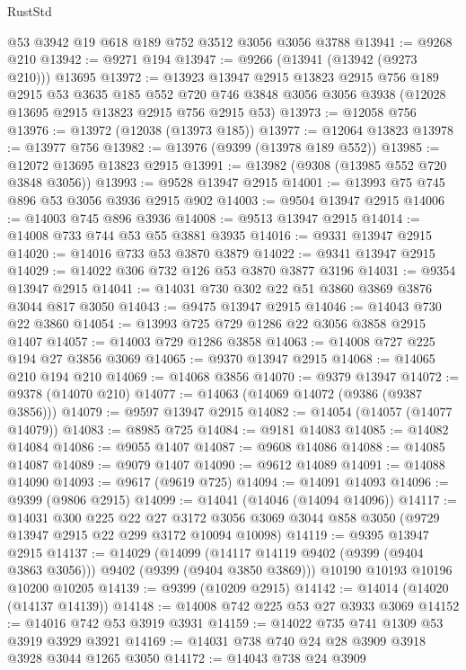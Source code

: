 \begin{lexlean}{RustStd}
\begin{coremodule}
    @53
    @3942
    @19
    @618
    @189
    @752
    @3512
    @3056
    @3056
    @3788
@13941 := @9268 @210
@13942 := @9271 @194
@13947 := @9266 (@13941 (@13942 (@9273 @210))) @13695
@13972 := @13923
    @13947
    @2915
    @13823
    @2915
    @756
    @189
    @2915
    @53
    @3635
    @185
    @552
    @720
    @746
    @3848
    @3056
    @3056
    @3938
    (@12028 @13695 @2915 @13823 @2915 @756 @2915 @53)
@13973 := @12058 @756
@13976 := @13972 (@12038 (@13973 @185))
@13977 := @12064 @13823
@13978 := @13977 @756
@13982 := @13976 (@9399 (@13978 @189 @552))
@13985 := @12072 @13695 @13823 @2915
@13991 := @13982 (@9308 (@13985 @552 @720 @3848 @3056))
@13993 := @9528 @13947 @2915
@14001 := @13993 @75 @745 @896 @53 @3056 @3936 @2915 @902
@14003 := @9504 @13947 @2915
@14006 := @14003 @745 @896 @3936
@14008 := @9513 @13947 @2915
@14014 := @14008 @733 @744 @53 @55 @3881 @3935
@14016 := @9331 @13947 @2915
@14020 := @14016 @733 @53 @3870 @3879
@14022 := @9341 @13947 @2915
@14029 := @14022 @306 @732 @126 @53 @3870 @3877 @3196
@14031 := @9354 @13947 @2915
@14041 := @14031 @730 @302 @22 @51 @3860 @3869 @3876 @3044 @817 @3050
@14043 := @9475 @13947 @2915
@14046 := @14043 @730 @22 @3860
@14054 := @13993 @725 @729 @1286 @22 @3056 @3858 @2915 @1407
@14057 := @14003 @729 @1286 @3858
@14063 := @14008 @727 @225 @194 @27 @3856 @3069
@14065 := @9370 @13947 @2915
@14068 := @14065 @210 @194 @210
@14069 := @14068 @3856
@14070 := @9379 @13947
@14072 := @9378 (@14070 @210)
@14077 := @14063 (@14069 @14072 (@9386 (@9387 @3856)))
@14079 := @9597 @13947 @2915
@14082 := @14054 (@14057 (@14077 @14079))
@14083 := @8985 @725
@14084 := @9181 @14083
@14085 := @14082 @14084
@14086 := @9055 @1407
@14087 := @9608 @14086
@14088 := @14085 @14087
@14089 := @9079 @1407
@14090 := @9612 @14089
@14091 := @14088 @14090
@14093 := @9617 (@9619 @725)
@14094 := @14091 @14093
@14096 := @9399 (@9806 @2915)
@14099 := @14041 (@14046 (@14094 @14096))
@14117 := @14031
    @300
    @225
    @22
    @27
    @3172
    @3056
    @3069
    @3044
    @858
    @3050
    (@9729 @13947 @2915 @22 @299 @3172 @10094 @10098)
@14119 := @9395 @13947 @2915
@14137 := @14029
    (@14099 (@14117 @14119 @9402 (@9399 (@9404 @3863 @3056))) @9402 (@9399 (@9404 @3850 @3869)))
    @10190
    @10193
    @10196
    @10200
    @10205
@14139 := @9399 (@10209 @2915)
@14142 := @14014 (@14020 (@14137 @14139))
@14148 := @14008 @742 @225 @53 @27 @3933 @3069
@14152 := @14016 @742 @53 @3919 @3931
@14159 := @14022 @735 @741 @1309 @53 @3919 @3929 @3921
@14169 := @14031 @738 @740 @24 @28 @3909 @3918 @3928 @3044 @1265 @3050
@14172 := @14043 @738 @24 @3909

\end{coremodule}
\end{lexlean}
